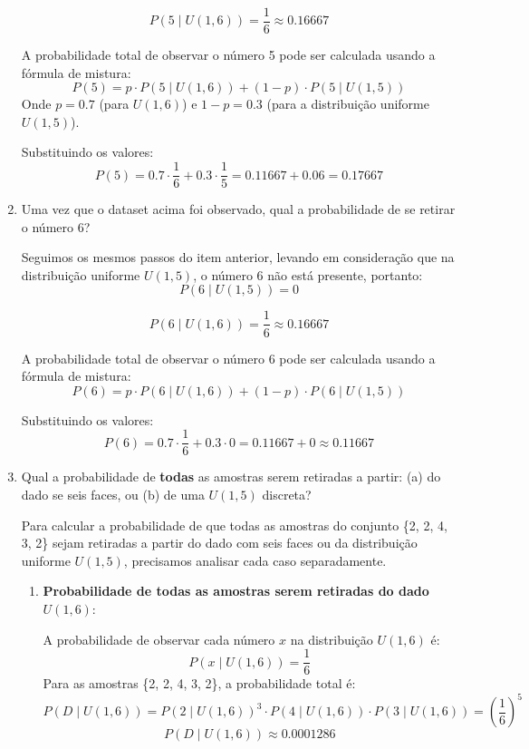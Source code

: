 \documentclass[12 pt]{article}
\begin{document}
\begin{enumerate}
\begin{tcolorbox}[colback=white, colframe=black, title=Resposta:]
   \[
    P(5 \mid U(1,6)) = \frac{1}{6} \approx 0.16667
    \]

   A probabilidade total de observar o número 5 pode ser calculada usando a fórmula de mistura:
   \[
   P(5) = p \cdot P(5 \mid U(1,6)) + (1 - p) \cdot P(5 \mid U(1,5))
   \]
   Onde \( p = 0.7 \) (para \( U(1,6) \)) e \( 1 - p = 0.3 \) (para a distribuição uniforme \( U(1,5) \)). 

   Substituindo os valores:
   \[
   P(5) = 0.7 \cdot \frac{1}{6} + 0.3 \cdot \frac{1}{5} = 0.11667 + 0.06 = 0.17667
   \]

    \end{tcolorbox}
    \item Uma vez que o dataset acima foi observado, qual a probabilidade de se retirar o número 6?
    \begin{tcolorbox}[colback=white, colframe=black, title=Resposta:]
        Seguimos os mesmos passos do item anterior, levando em consideração que na distribuição uniforme \( U(1, 5) \), o número 6 não está presente, portanto:
        \[
        P(6 \mid U(1,5)) = 0
        \]
    
        \[
        P(6 \mid U(1,6)) = \frac{1}{6} \approx 0.16667
        \]
    
        A probabilidade total de observar o número 6 pode ser calculada usando a fórmula de mistura:
        \[
        P(6) = p \cdot P(6 \mid U(1,6)) + (1 - p) \cdot P(6 \mid U(1,5))
        \]
    
        Substituindo os valores:
        \[
        P(6) = 0.7 \cdot \frac{1}{6} + 0.3 \cdot 0 = 0.11667 + 0 \approx 0.11667
        \]
    \end{tcolorbox}
    
    \item Qual a probabilidade de \textbf{todas} as amostras serem retiradas a partir: (a) do dado se seis faces, ou (b) de uma $U(1, 5)$ discreta?
    \begin{tcolorbox}[colback=white, colframe=black, title=Resposta:]
        Para calcular a probabilidade de que todas as amostras do conjunto \{2, 2, 4, 3, 2\} sejam retiradas a partir do dado com seis faces ou da distribuição uniforme \( U(1, 5) \), precisamos analisar cada caso separadamente.
    
        \begin{enumerate}
            \item \textbf{Probabilidade de todas as amostras serem retiradas do dado \( U(1, 6) \)}:
            
            A probabilidade de observar cada número \( x \) na distribuição \( U(1, 6) \) é:
            \[
            P(x \mid U(1,6)) = \frac{1}{6}
            \]
            Para as amostras \{2, 2, 4, 3, 2\}, a probabilidade total é:
            \[
            P(D \mid U(1,6)) = P(2\mid U(1,6))^3 \cdot P(4\mid U(1,6)) \cdot P(3\mid U(1,6)) = \left(\frac{1}{6}\right)^5
            \]
            \[
            P(D \mid U(1,6)) \approx 0.0001286
            \]
    

\end{enumerate}
\end{tcolorbox}
\end{enumerate}
\end{document}
